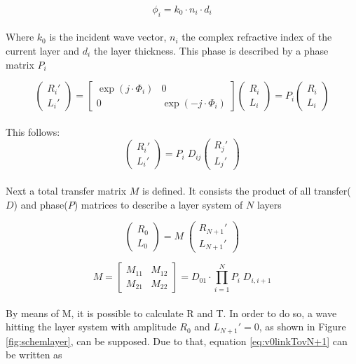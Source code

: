 \begin{equation}
\phi_i = k_0 \cdot n_i \cdot d_i
\label{eq:matKoeff}
\end{equation}
\\
Where $k_0$ is the incident wave vector, $n_i$ the complex refractive index of the current layer and $d_i$ the layer thickness. This phase is described by a phase matrix $P_i$

\begin{equation}
\begin{pmatrix}R_i' \\ L_i'\end{pmatrix}= 
\begin{bmatrix}
\exp(j \cdot \Phi_i) & 0 \\ 0 & \exp(-j \cdot \Phi_i)
\end{bmatrix}\begin{pmatrix}R_i \\ L_i\end{pmatrix}
= P_i \begin{pmatrix}R_i \\ L_i\end{pmatrix}
\label{eq:PMat}
\end{equation}
\\
This follows:
\begin{equation}
\begin{pmatrix}R_i' \\ L_i'\end{pmatrix}= 
P_i\;D_{ij} \begin{pmatrix}R_j' \\ L_j'\end{pmatrix}
\end{equation}
\\
Next a total transfer matrix $M$ is defined. It consists the product of all transfer($D$) and phase($P$) matrices to describe a layer system of $N$ layers

\begin{equation}
\begin{pmatrix}R_0 \\ L_0\end{pmatrix}
= M \;  \begin{pmatrix}R_{N+1}' \\ L_{N+1}' \end{pmatrix}
\label{eq:v0linkTovN+1}
\end{equation}

\begin{equation}
M = \begin{bmatrix}
M_{11} & M_{12} \\ M_{21} & M_{22}
\end{bmatrix} 
= D_{01} \cdot \prod \limits_{i=1}^{N} P_i \; D_{i, i + 1} 
\label{eq:matTMM}
\end{equation}
\\
By means of M, it is possible to calculate R and T. In order to do so, a wave hitting the layer system with amplitude $R_0$ and $L_{N+1}' = 0$, as shown in Figure \ref{fig:schemlayer}, can be supposed. Due to that, equation \eqref{eq:v0linkTovN+1} can be written as

